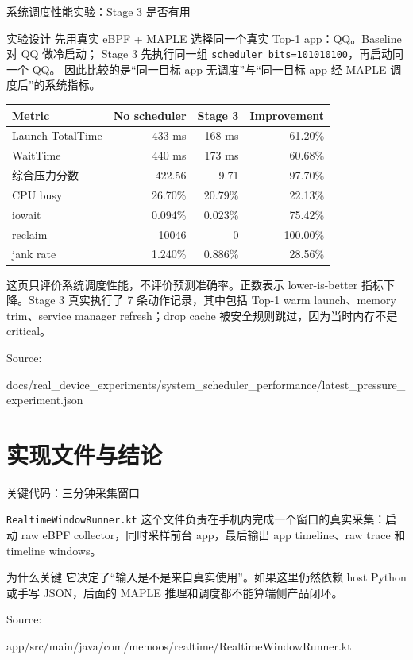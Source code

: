 \documentclass[UTF8,aspectratio=169,10pt]{ctexbeamer}
\newcommand{\code}[1]{\texttt{\small #1}}
\newcommand{\sourcefoot}[1]{%
  \vfill
  {\scriptsize\textcolor{memoGray}{Source: }%
  \parbox[t]{0.84\textwidth}{\raggedright\ttfamily\scriptsize #1}}%
}
\newcommand{\explainfoot}[1]{%
  \vspace{0.35em}
  {\scriptsize\color{memoGray}#1}
}
\begin{document}
\begin{frame}{系统调度性能实验：Stage 3 是否有用}
  \scriptsize
  \begin{block}{实验设计}
    先用真实 eBPF + MAPLE 选择同一个真实 Top-1 app：QQ。Baseline 对 QQ 做冷启动；
    Stage 3 先执行同一组 \code{scheduler\_bits=101010100}，再启动同一个 QQ。
    因此比较的是“同一目标 app 无调度”与“同一目标 app 经 MAPLE 调度后”的系统指标。
  \end{block}
  \begin{tabular}{lrrr}
    \toprule
    Metric & No scheduler & Stage 3 & Improvement \\
    \midrule
    Launch TotalTime & 433 ms & 168 ms & 61.20\% \\
    WaitTime & 440 ms & 173 ms & 60.68\% \\
    综合压力分数 & 422.56 & 9.71 & 97.70\% \\
    CPU busy & 26.70\% & 20.79\% & 22.13\% \\
    iowait & 0.094\% & 0.023\% & 75.42\% \\
    reclaim & 10046 & 0 & 100.00\% \\
    jank rate & 1.240\% & 0.886\% & 28.56\% \\
    \bottomrule
  \end{tabular}
  \vspace{0.45em}
  \explainfoot{这页只评价系统调度性能，不评价预测准确率。正数表示 lower-is-better 指标下降。Stage 3 真实执行了 7 条动作记录，其中包括 Top-1 warm launch、memory trim、service manager refresh；drop cache 被安全规则跳过，因为当时内存不是 critical。}
  \sourcefoot{docs/real\_device\_experiments/system\_scheduler\_performance/latest\_pressure\_experiment.json}
\end{frame}

\section{实现文件与结论}

\begin{frame}{关键代码：三分钟采集窗口}
  \begin{block}{\code{RealtimeWindowRunner.kt}}
    这个文件负责在手机内完成一个窗口的真实采集：启动 raw eBPF collector，同时采样前台 app，最后输出 app timeline、raw trace 和 timeline windows。
  \end{block}
  \begin{block}{为什么关键}
    它决定了“输入是不是来自真实使用”。如果这里仍然依赖 host Python 或手写 JSON，后面的 MAPLE 推理和调度都不能算端侧产品闭环。
  \end{block}
  \sourcefoot{app/src/main/java/com/memoos/realtime/RealtimeWindowRunner.kt}
\end{frame}
\end{document}
